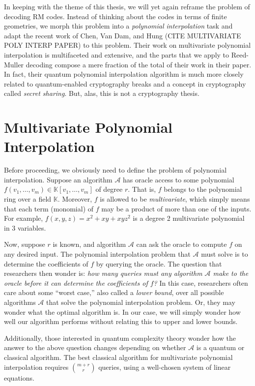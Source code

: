 \documentclass[12pt,twoside]{reedthesis}
\theoremstyle{definition}
\newcommand{\K}{\mathbb{K}}
\begin{document}
In keeping with the theme of this thesis, we will yet again reframe the problem of decoding RM codes. Instead of thinking about the codes in terms of finite geometries, we morph this problem into a \textit{polynomial interpolation} task and adapt the recent work of Chen, Van Dam, and Hung (CITE MULTIVARIATE POLY INTERP PAPER) to this problem. Their work on multivariate polynomial interpolation is multifaceted and extensive, and the parts that we apply to Reed-Muller decoding compose a mere fraction of the total of their work in their paper. In fact, their quantum polynomial interpolation algorithm is much more closely related to quantum-enabled cryptography breaks and a concept in cryptography called \textit{secret sharing}. But, alas, this is not a cryptography thesis.

\section{Multivariate Polynomial Interpolation}
Before proceeding, we obviously need to define the problem of polynomial interpolation. Suppose an algorithm $\mathcal{A}$ has oracle access to some polynomial $f(v_1, \ldots, v_m) \in \K[v_1, \ldots, v_m]$ of degree $r$. That is, $f$ belongs to the polynomial ring over a field $\K$. Moreover, $f$ is allowed to be \textit{multivariate}, which simply means that each term (monomial) of $f$ may be a product of more than one of the inputs. For example, $f(x,y,z) = x^2 + xy + xyz^2$ is a degree 2 multivariate polynomial in 3 variables.

Now, suppose $r$ is known, and algorithm $\mathcal{A}$ can ask the oracle to compute $f$ on any desired input. The polynomial interpolation problem that $\mathcal{A}$ must solve is to determine the coefficients of $f$ by querying the oracle. The question that researchers then wonder is: \textit{how many queries must any algorithm $\mathcal{A}$ make to the oracle before it can determine the coefficients of $f$?} In this case, researchers often care about some ``worst case,'' also called a \textit{lower bound}, over all possible algorithms $\mathcal{A}$ that solve the polynomial interpolation problem. Or, they may wonder what the optimal algorithm is. In our case, we will simply wonder how well our algorithm performs without relating this to upper and lower bounds. 

Additionally, those interested in quantum complexity theory wonder how the answer to the above question changes depending on whether $\mathcal{A}$ is a quantum or classical algorithm. The best classical algorithm for multivariate polynomial interpolation requires ${m +r \choose r}$ queries, using a well-chosen system of linear equations.
\end{document}
